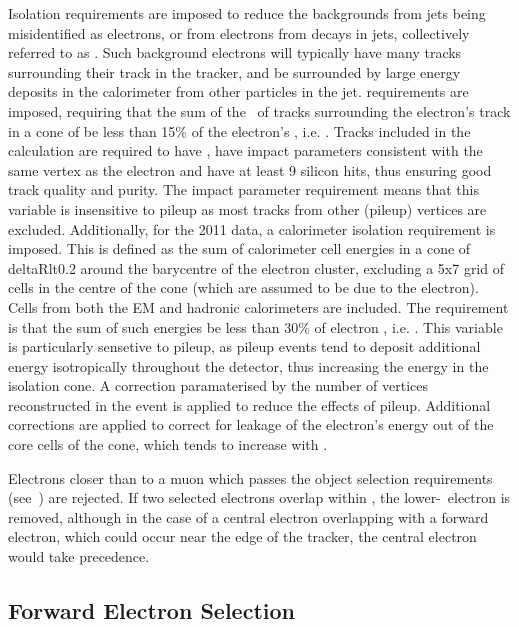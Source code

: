 Isolation requirements are imposed to reduce the backgrounds from jets being
misidentified as electrons, or from electrons from decays in jets, collectively
referred to as . Such background electrons will
typically have many tracks surrounding their track in the tracker, and be
surrounded by large energy deposits in the calorimeter from other particles in
the jet.  requirements are imposed, requiring that the
sum of the \pt\ of tracks surrounding the electron's track in a cone of
 be less than 15\% of the electron's \pt, i.e.
. Tracks included in the calculation are required to have
, have impact parameters consistent with the same vertex as the
electron and have at least 9 silicon hits, thus ensuring good track quality and
purity. The impact parameter requirement means that this variable is insensitive
to pileup as most tracks from other (pileup) vertices are excluded.
Additionally, for the 2011 data, a calorimeter isolation requirement is imposed.
This is defined as the sum of calorimeter cell energies in a cone of
deltaRlt{0.2} around the barycentre of the electron cluster, excluding a 5x7
grid of cells in the centre of the cone (which are assumed to be due to the
electron). Cells from both the EM and hadronic calorimeters are included. The
requirement is that the sum of such energies be less than 30\% of electron \et,
i.e. .  This variable is particularly sensetive to pileup,
as pileup events tend to deposit additional energy isotropically throughout the
detector, thus increasing the energy in the isolation cone. A correction
paramaterised by the number of vertices reconstructed in the event is applied to
reduce the effects of pileup.  Additional corrections are applied to correct for
leakage of the electron's energy out of the core cells of the cone, which tends
to increase with \pt.

Electrons closer than  to a muon which passes the object selection
requirements (see~) are rejected. If two selected electrons
overlap within , the lower-\et\ electron is removed, although in
the case of a central electron overlapping with a forward electron, which could
occur near the edge of the tracker, the central electron would take precedence.

\subsection{Forward Electron Selection}

